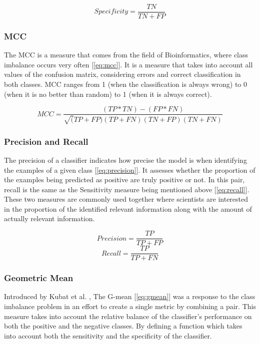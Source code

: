 \begin{equation}
    Specificity = \frac{TN}{TN+FP} 
    \label{eq:specificity}
\end{equation}

\subsubsection{MCC}
The MCC \cite{matthews1975comparison} is a measure that comes from the field of Bioinformatics, 
where class imbalance occurs very often [\ref{eq:mcc}]. It is a measure that takes into account 
all values of the confusion matrix, considering errors and correct classification in both classes. 
MCC ranges from 1 (when the classification is always wrong) to 0 (when it is no better than random) 
to 1 (when it is always correct).

\begin{equation}
    MCC = \frac{(TP*TN)-(FP*FN)}{\sqrt(TP+FP)(TP+FN)(TN+FP)(TN+FN)} 
    \label{eq:mcc}
\end{equation}

\subsubsection{Precision and Recall}

The precision of a classifier indicates how precise the model is when identifying the examples 
of a given class [\ref{eq:precision}]. It assesses whether the proportion of the examples being predicted 
as positive are truly positive or not. In this pair, recall is the same as the Sensitivity measure 
being mentioned above [\ref{eq:recall}]. These two measures are commonly used together where scientists 
are interested in the proportion of the identified relevant information along with the amount of 
actually relevant information.

\begin{equation}
    Precision = \frac{TP}{TP+FP} 
    \label{eq:precision}
\end{equation}
\begin{equation}
    Recall = \frac{TP}{TP+FN} 
    \label{eq:recall}
\end{equation}

\subsubsection{Geometric Mean}
Introduced by Kubat et al. \cite{kubat1998machine}, The G-mean [\ref{eq:gmean}] was a response to the class 
imbalance problem in an effort to create a single metric by combining a pair. This measure takes 
into account the relative balance of the classifier’s performance on both the positive and the 
negative classes. By defining a function which takes into account both the sensitivity and the 
specificity of the classifier.

